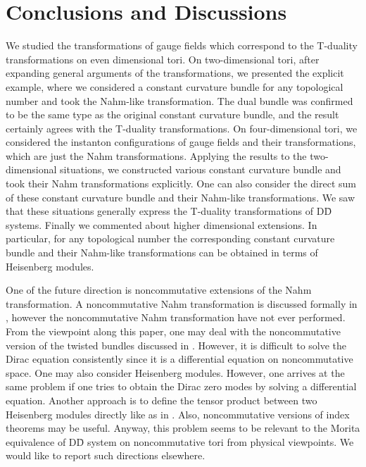 \documentclass[a4paper,epsf,12pt]{article}
\begin{document}
\section{Conclusions and Discussions}


We studied the transformations of gauge fields which 
correspond to the T-duality transformations 
on even dimensional tori. 
On two-dimensional tori, after expanding general arguments of 
the transformations, 
we presented the explicit example, where 
we considered a constant curvature bundle for any topological 
number and took the Nahm-like transformation. 
The dual bundle was confirmed to be the same type as the original 
constant curvature bundle, and the result certainly agrees with the 
T-duality transformations. 
On four-dimensional tori, we considered the instanton configurations 
of gauge fields and their transformations, which are just the 
Nahm transformations. 
Applying the results to the two-dimensional situations, 
we constructed various constant curvature bundle and took their 
Nahm transformations explicitly. 
One can also consider the direct sum of these constant curvature bundle 
and their Nahm-like transformations. 
We saw that these situations generally express the 
T-duality transformations of D\=D systems. 
Finally we commented about higher dimensional extensions. 
In particular, for any topological number the corresponding 
constant curvature bundle 
and their Nahm-like transformations can be obtained in terms of 
Heisenberg modules.  



One of the future direction is noncommutative extensions of 
the Nahm transformation. 
A noncommutative Nahm transformation is discussed formally 
in \cite{ANS}, however the noncommutative Nahm transformation have not 
ever performed. 
{}From the viewpoint along this paper, 
one may deal with the noncommutative version of the twisted bundles
discussed in \cite{Ho, MoZu}. 
However, it is difficult to solve the Dirac equation consistently 
since it is a differential equation on noncommutative space. 
One may also consider Heisenberg modules. 
However, one arrives at the same problem if 
one tries to obtain the Dirac zero modes by 
solving a differential equation. 
Another approach is to define the tensor product between 
two Heisenberg modules directly like as in \cite{DiSc, Kajiura2}. 
Also, noncommutative versions of index theorems may be useful. 
Anyway, this problem seems to be relevant to the 
Morita equivalence \cite{KoSc} of D\=D system on noncommutative tori
\cite{BKMT,KMT} from physical viewpoints. 
We would like to report such directions elsewhere. 
\end{document}
